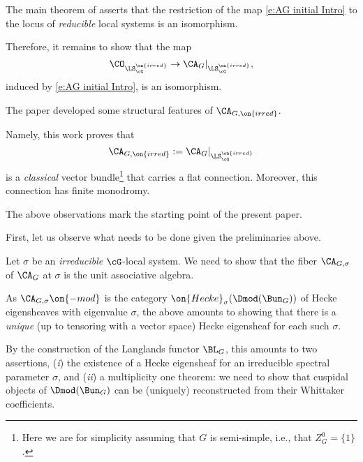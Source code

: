 \documentclass[9pt]{amsart}
\theoremstyle{remark}
\theoremstyle{definition}
\theoremstyle{remark}
\numberwithin{equation}{section}
\renewcommand{\mod}{{\on{-mod}}}
\begin{document}
\sssec{}

The main theorem of \cite{GLC3} asserts
that the restriction of the map \eqref{e:AG initial Intro} 
to the locus of \emph{reducible} local systems is an isomorphism. 

\medskip

Therefore, it remains to show that the map
\begin{equation} \label{e:AG irred Intro}
\CO_{\LS_\cG^{\on{irred}}}\to \CA_G|_{\LS_\cG^{\on{irred}}}, 
\end{equation}
induced by \eqref{e:AG initial Intro}, is an isomorphism. 

\sssec{} \label{sss:A red Intro}

The paper \cite{GLC4} developed some structural features of $\CA_{G,\on{irred}}$.

\medskip 

Namely, this work proves that  
$$\CA_{G,\on{irred}}:=\CA_G|_{\LS_\cG^{\on{irred}}}$$
is a \emph{classical} vector bundle\footnote{Here we are for simplicity assuming that $G$ is semi-simple, i.e.,
that $Z^0_G=\{1\}$.} that carries a flat connection. Moreover, this connection 
has finite monodromy. 

\sssec{}

The above observations mark the starting point of the present paper.

\label{ss:proof outline}

\sssec{}\label{sss:what is to be done}
First, let us observe what needs to be done given the preliminaries above.

\medskip

Let $\sigma$ be an \emph{irreducible} $\cG$-local system. We need to 
show that the fiber $\CA_{G,\sigma}$ of $\CA_G$ at $\sigma$ is the unit
associative algebra. 

\medskip 

As $\CA_{G,\sigma}\mod$ is the category $\on{Hecke}_{\sigma}(\Dmod(\Bun_G))$ 
of Hecke eigensheaves with 
eigenvalue $\sigma$, the above amounts to showing that there
is a \emph{unique} (up to tensoring with a vector space) 
Hecke eigensheaf for each such $\sigma$.

\medskip 

By the construction of the Langlands functor $\BL_G$, this amounts to 
two assertions, (\emph{i}) the existence of a Hecke eigensheaf for an
irreducible spectral parameter $\sigma$, and (\emph{ii}) 
a multiplicity one theorem: we need to show
that cuspidal objects of $\Dmod(\Bun_G)$ 
can be (uniquely) reconstructed from their Whittaker coefficients.
\end{document}
